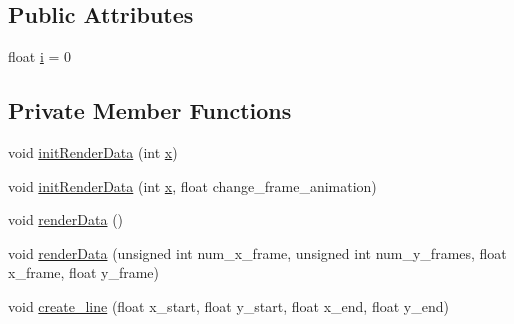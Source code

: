 \subsection*{Public Attributes}
\begin{DoxyCompactItemize}
\item 
float \hyperlink{classSpriteRenderer_acac67b549358ea6335e0310531005382}{i} = 0
\end{DoxyCompactItemize}
\subsection*{Private Member Functions}
\begin{DoxyCompactItemize}
\item 
void \hyperlink{classSpriteRenderer_a45cb93ead211846b0154a8f49b189c50}{init\+Render\+Data} (int \hyperlink{classSpriteRenderer_a448f55e5de2b2b31a641d65e148fb99b}{x})
\item 
void \hyperlink{classSpriteRenderer_ab88c5fde8d172186b73682e871a8bc40}{init\+Render\+Data} (int \hyperlink{classSpriteRenderer_a448f55e5de2b2b31a641d65e148fb99b}{x}, float change\+\_\+frame\+\_\+animation)
\item 
void \hyperlink{classSpriteRenderer_a43f81b7c19394f08227fa5c0f66c9199}{render\+Data} ()
\item 
void \hyperlink{classSpriteRenderer_a4ecc9a7ab7334f2a44cfa2db2f2ca678}{render\+Data} (unsigned int num\+\_\+x\+\_\+frame, unsigned int num\+\_\+y\+\_\+frames, float x\+\_\+frame, float y\+\_\+frame)
\item 
void \hyperlink{classSpriteRenderer_ac18cdf1f92c62b8de313c3e3a7e78621}{create\+\_\+line} (float x\+\_\+start, float y\+\_\+start, float x\+\_\+end, float y\+\_\+end)
\end{DoxyCompactItemize}
